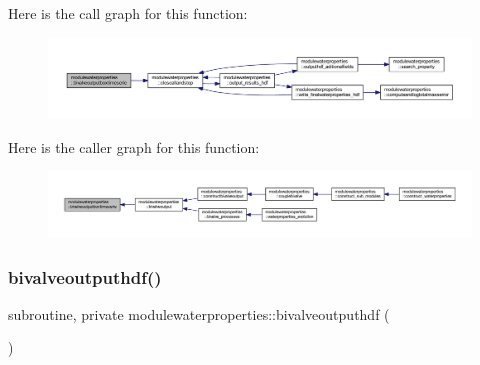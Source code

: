 Here is the call graph for this function\+:\nopagebreak
\begin{figure}[H]
\begin{center}
\leavevmode
\includegraphics[width=350pt]{namespacemodulewaterproperties_afcdb7811c7721d558a0d6ec94b87f297_cgraph}
\end{center}
\end{figure}
Here is the caller graph for this function\+:\nopagebreak
\begin{figure}[H]
\begin{center}
\leavevmode
\includegraphics[width=350pt]{namespacemodulewaterproperties_afcdb7811c7721d558a0d6ec94b87f297_icgraph}
\end{center}
\end{figure}
\mbox{\label{namespacemodulewaterproperties_a6d9213c5f38db58c01899d8b68076950}} 
\subsubsection{\texorpdfstring{bivalveoutputhdf()}{bivalveoutputhdf()}}
{\footnotesize\ttfamily subroutine, private modulewaterproperties\+::bivalveoutputhdf (\begin{DoxyParamCaption}{ }\end{DoxyParamCaption})\hspace{0.3cm}{\ttfamily [private]}}

